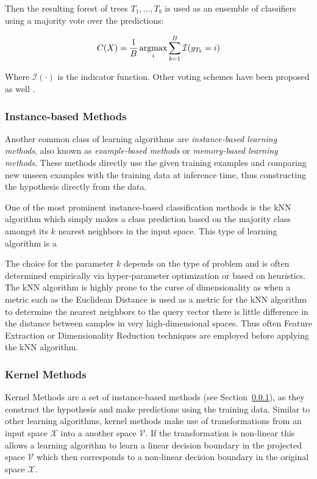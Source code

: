 Then the resulting forest of trees ${T_1, \ldots, T_b}$ is used as an ensemble of classifiers using a majority vote over the predictions:

\begin{equation}
  C(X) = \frac{1}{B} \argmax_i \sum_{b = 1}^B \mathcal{I}(y_{T_b} = i)
\end{equation}

Where $\mathcal{I}(\cdot)$ is the indicator function. Other voting schemes have been proposed as well .

\subsubsection{Instance-based Methods}
\label{subs:Instance-based Methods}

Another common class of learning algorithms are \emph{instance-based learning methods}, also known as \emph{example-based methods} or \emph{memory-based learning methods}. These methods directly use the given training examples and comparing new unseen examples with the training data at inference time, thus constructing the hypothesis directly from the data.

One of the most prominent instance-based classification methods is the \gls{kNN} algorithm which simply makes a class prediction based on the majority class amongst its $k$ nearest neighbors in the input space. This type of learning algorithm is a

The choice for the parameter $k$ depends on the type of problem and is often determined empirically via hyper-parameter optimization or based on heuristics. The \gls{kNN} algorithm is highly prone to the curse of dimensionality as when a metric such as the Euclidean Distance is used as a metric for the \gls{kNN} algorithm to determine the nearest neighbors to the query vector there is little difference in the distance between samples in very high-dimensional spaces. Thus often \gls{Feature Extraction} or \gls{Dimensionality Reduction} techniques are employed before applying the \gls{kNN} algorithm.

\subsubsection{Kernel Methods}
\label{subs:Kernel Methods}

Kernel Methods are a set of instance-based methods (see Section~\ref{subs:Instance-based Methods}), as they construct the hypothesis and make predictions using the training data. Similar to other learning algorithms, kernel methods make use of transformations from an input space $\mathcal{X}$ into a another space $\mathcal{V}$. If the transformation is non-linear this allows a learning algorithm to learn a linear decision boundary in the projected space $\mathcal{V}$ which then corresponds to a non-linear decision boundary in the original space $\mathcal{X}$.


